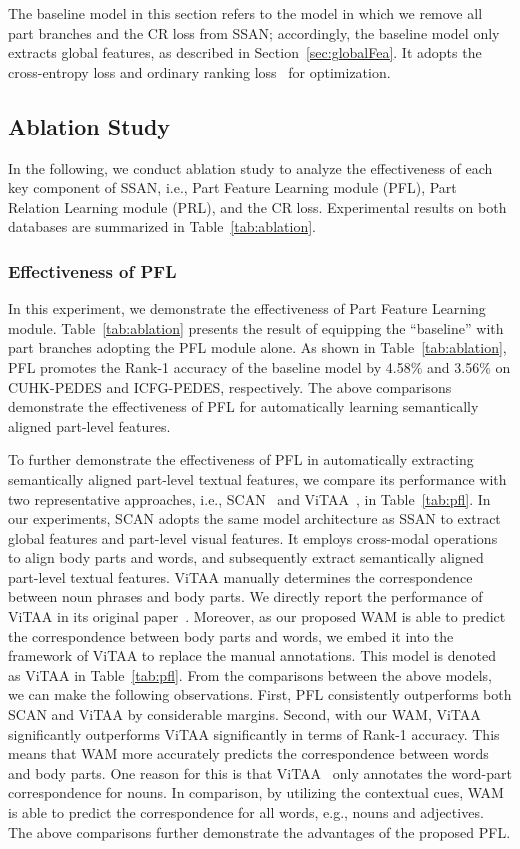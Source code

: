 \documentclass[journal]{IEEEtran}
\begin{document}
The baseline model in this section refers to the model in which we remove all part branches and the CR loss from SSAN; accordingly, the baseline model only extracts global features, as described in Section~\ref{sec:globalFea}. It adopts the cross-entropy loss and ordinary ranking loss~\cite{faghri2017vse++} for optimization.

\subsection{Ablation Study}
\label{sec:ablation}
In the following, we conduct ablation study to analyze the effectiveness of each key component of SSAN, i.e., Part Feature Learning module (PFL), Part Relation Learning module (PRL), and the CR loss. Experimental results on both databases are summarized in Table~\ref{tab:ablation}.


\subsubsection{Effectiveness of PFL}\label{ablation_pfl} In this experiment, we demonstrate the effectiveness of Part Feature Learning module.
Table~\ref{tab:ablation} presents the result of equipping the ``baseline''  with  part branches adopting the PFL module alone.
As shown in Table~\ref{tab:ablation}, PFL promotes the Rank-1 accuracy of the baseline model by 4.58\% and 3.56\% on CUHK-PEDES and ICFG-PEDES, respectively.
The above comparisons demonstrate the effectiveness of PFL for automatically learning semantically aligned part-level features.

To further demonstrate the effectiveness of PFL in automatically extracting semantically aligned part-level textual features,
we compare its performance with two representative approaches, i.e., SCAN~\cite{lee2018stacked} and ViTAA~\cite{wang2020vitaa}, in Table~\ref{tab:pfl}.
In our experiments, SCAN adopts the same model architecture as SSAN to extract global features and part-level visual features.
It employs cross-modal operations to align body parts and words,
and subsequently extract semantically aligned part-level textual features.
ViTAA manually determines the correspondence between noun phrases and body parts.
We directly report the performance of ViTAA in its original paper~\cite{wang2020vitaa}.
Moreover, as our proposed WAM is able to predict the correspondence between body parts and words, we embed it into the framework of ViTAA to replace the manual annotations.
This model is denoted as ViTAA in Table~\ref{tab:pfl}. From the comparisons between the above models, we can make the following observations.
First, PFL consistently outperforms both SCAN and ViTAA by considerable margins.
Second, with our WAM, ViTAA significantly outperforms ViTAA significantly in terms of Rank-1 accuracy.
This means that WAM  more accurately predicts the correspondence between words and body parts.
One reason for this is that ViTAA~\cite{wang2020vitaa} only annotates the word-part correspondence for nouns.
In comparison, by utilizing the contextual cues, WAM is able to predict the correspondence for all words, e.g., nouns and adjectives.
The above comparisons further demonstrate the advantages of the proposed PFL.
\end{document}
